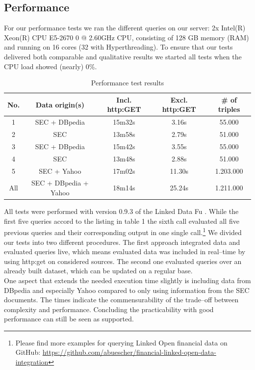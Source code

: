 \documentclass[runningheads]{llncs}
\begin{document}
\subsection{Performance}
\label{6.2.}
For our performance tests we ran the different queries on our server: 2x Intel(R) Xeon(R) CPU E5-2670 0 @ 2.60GHz CPU, consisting of 128 GB memory (RAM) and running on 16 cores (32 with Hyperthreading). To ensure that our tests delivered both comparable and qualitative results we started all tests when the CPU load showed (nearly) 0\%.
\begin{table}
\centering
\begin{tabular}{|c|c|c|c|c|}
\hline
\textbf{No.} & \textbf{Data origin(s)} & \textbf{Incl. http:GET} & \textbf{Excl. http:GET} & \textbf{\# of triples}\\
\hline
\hline
1 & SEC + DBpedia & 15m32s & 3.16s & 55.000\\
\hline
2 & SEC & 13m58s & 2.79s & 51.000\\
\hline
3 & SEC + DBpedia & 15m42s & 3.55s & 55.000\\
\hline
4 & SEC & 13m48s & 2.88s & 51.000\\
\hline
5 & SEC + Yahoo & 17m02s & 11.30s & 1.203.000\\
\hline
All & SEC + DBpedia + Yahoo & 18m14s & 25.24s & 1.211.000\\
\hline
\end{tabular}
\caption{Performance test results}
\end{table}
All tests were performed with version 0.9.3 of the Linked Data Fu \cite{SSHS13}. While the first five queries accord to the listing in table 1 the sixth call evaluated all five previous queries and  their corresponding output in one single call.\footnote{Please find more examples for querying Linked Open financial data on GitHub: \url{https://github.com/abuescher/financial-linked-open-data-integration}} We divided our tests into two different procedures. The first approach integrated data and evaluated queries live, which means evaluated data was included in real--time by using http:get on considered sources. The second one evaluated queries over an already built dataset, which can be updated on a regular base.\\
One aspect that extends the needed execution time slightly is including data from DBpedia and especially Yahoo compared to only using information from the SEC documents. The times indicate the commensurability of the trade--off between complexity and performance. Concluding the practicability with good performance can still be seen as supported.
\end{document}
